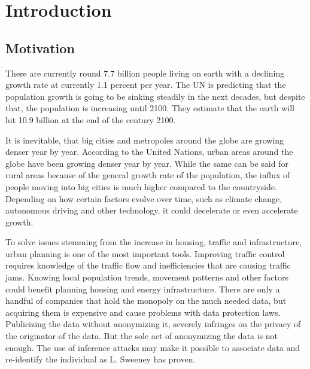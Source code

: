 
\chapter{Introduction}\label{chapter:introduction}
\section{Motivation}

There are currently round 7.7 billion people living on earth with a declining growth rate at currently 1.1 percent per year. The UN is predicting that the population growth is going to be sinking steadily in the next decades, but despite that, the population is increasing until 2100. They estimate that the earth will hit 10.9 billion at the end of the century 2100.

It is inevitable, that big cities and metropoles around the globe are growing denser year by year.
According to the United Nations, urban areas around the globe have been growing denser year by year. While the same can be said for rural areas because of the general growth rate of the population, the influx of people moving into big cities is much higher compared to the countryside.
Depending on how certain factors evolve over time, such as climate change, autonomous driving and other technology, it could decelerate or even accelerate growth.

To solve issues stemming from the increase in housing, traffic and infrastructure, urban planning is one of the most important tools. Improving traffic control requires knowledge of the traffic flow and inefficiencies that are causing traffic jams. Knowing local population trends, movement patterns and other factors could benefit planning housing and energy infrastructure. There are only a handful of companies that hold the monopoly on the much needed data, but acquiring them is expensive and cause problems with data protection laws. Publicizing the data without anonymizing it, severely infringes on the privacy of the originator of the data. But the sole act of anonymizing the data is not enough. The use of inference attacks may make it possible to associate data and re-identify the individual as L. Sweeney has proven.

